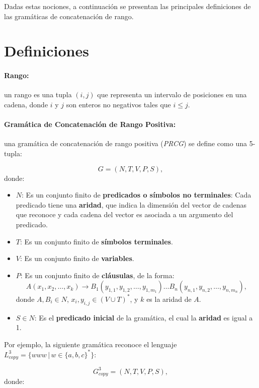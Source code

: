 Dadas estas nociones, a continuación se presentan las principales definiciones de las gramáticas de concatenación de rango.

\section{Definiciones}

\paragraph{Rango:} un rango es una tupla $(i, j)$ que representa un intervalo de posiciones en una cadena, donde $i$ y $j$ son enteros no negativos tales que $i \leq j$.

\paragraph{Gramática de Concatenación de Rango Positiva:} una gramática de concatenación de rango positiva (\textit{PRCG}) se define como una 5-tupla:

\[
    G = (N, T, V, P, S),
\]
donde:

\begin{itemize}
    \item $N$: Es un conjunto finito de \textbf{predicados o símbolos no terminales}: Cada predicado tiene una \textbf{aridad}, que indica la dimensión del vector de cadenas que reconoce y cada cadena del vector es asociada a un argumento del predicado.
    \item $T$: Es un conjunto finito de \textbf{símbolos terminales}.
    \item $V$: Es un conjunto finito de \textbf{variables}.
    \item $P$: Es un conjunto finito de \textbf{cláusulas}, de la forma:
          \[
              A(x_1, x_2, \ldots, x_k) \to B_1(y_{1,1}, y_{1,2}, \ldots, y_{1,m_1}) \ldots B_n(y_{n,1}, y_{n,2}, \ldots, y_{n,m_n}),
          \]
          donde $A, B_i \in N$, $x_i, y_{i,j} \in (V \cup T)^*$, y $k$ es la aridad de $A$.
    \item $S \in N$: Es el \textbf{predicado inicial} de la gramática, el cual la \textbf{aridad} es igual a 1.
\end{itemize}

Por ejemplo, la siguiente gramática reconoce el lenguaje $L^3_{copy}=\{www\,|\,w\in \{a,b,c\}^*\}$:

\[
    G^3_{copy} = (N, T, V, P, S),
\]
donde:

